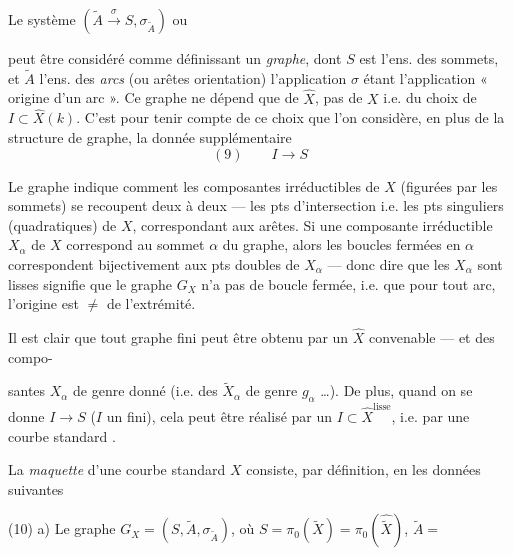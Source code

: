 \documentclass[11pt,a4paper]{article}
\begin{document}
Le système $(\widetilde{A} \xrightarrow{\sigma} S, \sigma_{\widetilde{A}})$ ou


peut être considéré comme définissant un \emph{graphe}, dont $S$ est l'ens. des sommets, et $\widetilde{A}$ l'ens. des \emph{arcs} (ou arêtes  orientation) l'application $\sigma$ étant l'application « origine d'un arc ». Ce graphe ne dépend que de $\widehat{X}$, pas de $X$ i.e. du choix de $I \subset \widehat{X}(k)$. C'est pour tenir compte de ce choix que l'on considère, en plus de la structure de graphe, la donnée supplémentaire
\[
(9)\qquad I \longrightarrow S
\]


Le graphe indique comment les composantes irréductibles de $X$ (figurées par les sommets) se recoupent deux à deux — les pts d'intersection  i.e. les pts singuliers (quadratiques) de $X$, correspondant aux arêtes. Si une composante irréductible $X_{\alpha}$ de $X$ correspond au sommet $\alpha$ du graphe, alors les boucles fermées en $\alpha$ correspondent bijectivement aux pts doubles de $X_{\alpha}$ — donc dire que les $X_{\alpha}$ sont lisses signifie que le graphe $G_{X}$ n'a pas de boucle fermée, i.e. que pour tout arc, l'origine est $\neq$ de l'extrémité.

Il est clair que tout graphe fini peut être obtenu   par un $\widehat{X}$ convenable — et \ill{} \ill{} des compo-

santes $X_{\alpha}$ de genre  donné (i.e. des $\widetilde{X}_{\alpha}$ de genre $g_{\alpha}$ …). De plus, quand on se donne  $I \to S$ ($I$ un fini), cela peut être réalisé par un $I \subset \widehat{X}^{\mathrm{lisse}}$, i.e. par une courbe standard .

La \emph{maquette} d'une courbe standard $X$ consiste, par définition, en les données suivantes

(10) a) Le graphe $G_{X} = (S, \widetilde{A}, \sigma_{\widetilde{A}})$, où $S = \pi_{0}(\widetilde{X}) = \pi_{0}(\widehat{\widetilde{X}})$, $\widetilde{A} =$  \struck{\ill{}}
\end{document}
